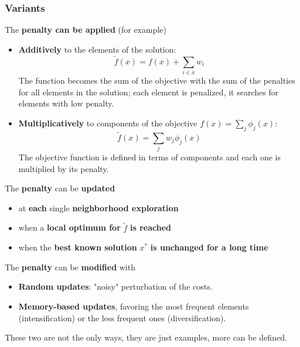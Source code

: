 \newpage

\subsubsection{Variants}

The \textbf{penalty can be applied} (for example)
\begin{itemize}
	\item \textbf{Additively} to the elements of the solution:
	$$ \tilde{f} (x) = f (x) + \sum_{i \in x} w_i $$
	The function becomes the sum of the objective with the sum of the penalties for all elements in the solution; each element is penalized, it searches for elements with low penalty.\\
	
	\item \textbf{Multiplicatively} to components of the objective $f (x) = \sum_j \phi_j (x)$:
	$$ \tilde{f} (x) = \sum_j w_j \phi_j (x) $$
	The objective function is defined in terms of components and each one is multiplied by its penalty.\\
\end{itemize}

The \textbf{penalty} can be \textbf{updated}
\begin{itemize}
	\item at \textbf{each} single \textbf{neighborhood exploration}
	
	\item when a \textbf{local optimum for} $\tilde{f}$ \textbf{is reached}
	
	\item when the \textbf{best known solution} $x^\ast$ \textbf{is unchanged for a long time}
\end{itemize}
\nn

The \textbf{penalty} can be \textbf{modified} with
\begin{itemize}
	\item \textbf{Random updates}: "noisy" perturbation of the costs.\\
	
	\item \textbf{Memory-based updates}, favoring the most frequent elements (intensification) or the less frequent ones (diversification).\\
\end{itemize}

These two are not the only ways, they are just examples, more can be defined.\\

